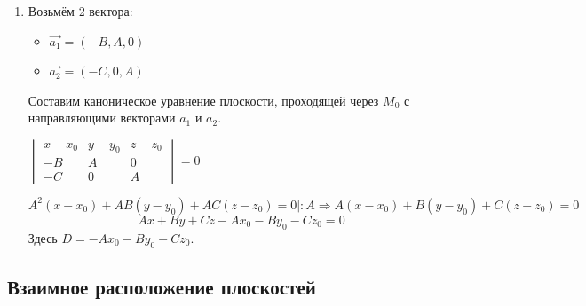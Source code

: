 \documentclass[a4paper]{article}
\begin{document}
\begin{hproof}
\begin{enumerate}
\begin{enumerate}
                                         \item Возьмём 2 вектора:

                                         \begin{itemize}
                                             \item $\vec{a_1} = (-B, A, 0)$
                                             \item $\vec{a_2} = (-C, 0, A)$
                                         \end{itemize}

                                         Составим каноническое уравнение плоскости, проходящей через $M_0$ с направляющими векторами $a_1$ и $a_2$.

                                         $\begin{vmatrix}
                                              x-x_0 & y-y_0 & z-z_0 \\
                                              -B    & A     & 0     \\
                                              -C    & 0     & A
                                         \end{vmatrix} = 0$

                                         \begin{equation}
                                             A^2(x-x_0) + AB(y-y_0)+AC(z-z_0) = 0|:A \Rightarrow A(x-x_0) + B(y-y_0)+C(z-z_0) = 0
                                         \end{equation}
                                         \begin{equation}
                                             Ax+By+Cz - Ax_0 - By_0 -Cz_0 = 0
                                         \end{equation}
                                         Здесь $D = - Ax_0 - By_0 -Cz_0$.

                                     \end{enumerate}
        \end{enumerate}
    \end{hproof}

    \newpage \begin{center}
                 \begin{Large}
                 \end{Large}
    \end{center}
    \subsection*{Взаимное расположение плоскостей}
\end{document}
